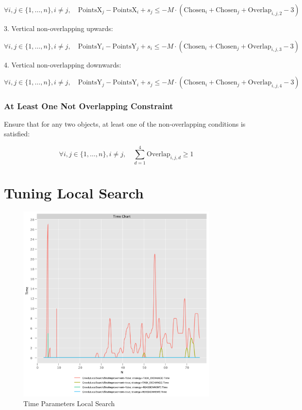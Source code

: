\documentclass{article}
\begin{document}
\[
\forall i, j \in \{1, \ldots, n\}, i \neq j, \quad \text{PointsX}_j - \text{PointsX}_i + s_j \leq -M \cdot (\text{Chosen}_i + \text{Chosen}_j + \text{Overlap}_{i,j,2} - 3)
\]

3. Vertical non-overlapping upwards:

\[
\forall i, j \in \{1, \ldots, n\}, i \neq j, \quad \text{PointsY}_i - \text{PointsY}_j + s_i \leq -M \cdot (\text{Chosen}_i + \text{Chosen}_j + \text{Overlap}_{i,j,3} - 3)
\]

4. Vertical non-overlapping downwards:

\[
\forall i, j \in \{1, \ldots, n\}, i \neq j, \quad \text{PointsY}_j - \text{PointsY}_i + s_j \leq -M \cdot (\text{Chosen}_i + \text{Chosen}_j + \text{Overlap}_{i,j,4} - 3)
\]

\subsubsection{At Least One Not Overlapping Constraint}

Ensure that for any two objects, at least one of the non-overlapping conditions is satisfied:

\[
\forall i, j \in \{1, \ldots, n\}, i \neq j, \quad \sum_{d=1}^4 \text{Overlap}_{i,j,d} \geq 1
\]

\newpage

\section{Tuning Local Search}

\begin{figure}[!h]
    \centering
    \includegraphics[width=0.9\textwidth]{./documentation/assets/localSearchParams.timeChart.pdf}
    \caption{Time Parameters Local Search}
    \label{fig:local_time}
\end{figure}\FloatBarrier
\end{document}
